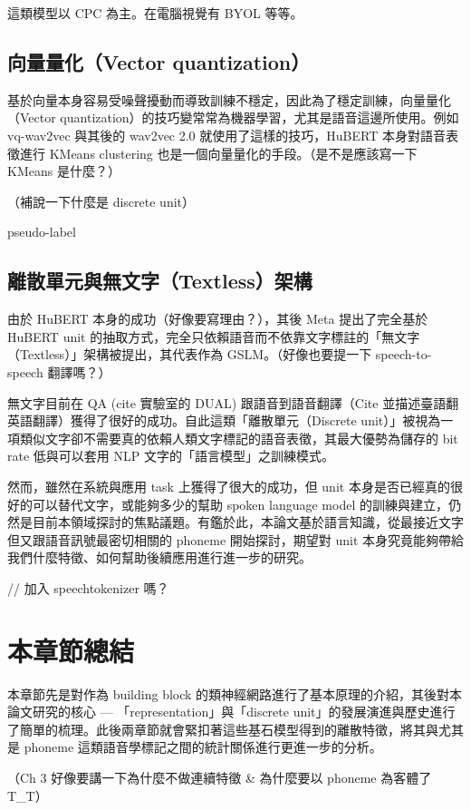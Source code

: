 這類模型以 CPC 為主。在電腦視覺有 BYOL 等等。

\subsection{向量量化（Vector quantization）}

基於向量本身容易受噪聲擾動而導致訓練不穩定，因此為了穩定訓練，向量量化（Vector quantization）的技巧變常常為機器學習，尤其是語音這邊所使用。例如 vq-wav2vec 與其後的 wav2vec 2.0 就使用了這樣的技巧，HuBERT 本身對語音表徵進行 KMeans clustering 也是一個向量量化的手段。（是不是應該寫一下 KMeans 是什麼？）

（補說一下什麼是 discrete unit）

pseudo-label 

\subsection{離散單元與無文字（Textless）架構}

由於 HuBERT 本身的成功（好像要寫理由？），其後 Meta 提出了完全基於 HuBERT unit 的抽取方式，完全只依賴語音而不依靠文字標註的「無文字（Textless）」架構被提出，其代表作為 GSLM。（好像也要提一下 speech-to-speech 翻譯嗎？）

無文字目前在 QA (cite 實驗室的 DUAL) 跟語音到語音翻譯（Cite 並描述臺語翻英語翻譯）獲得了很好的成功。自此這類「離散單元（Discrete unit）」被視為一項類似文字卻不需要真的依賴人類文字標記的語音表徵，其最大優勢為儲存的 bit rate 低與可以套用 NLP 文字的「語言模型」之訓練模式。

然而，雖然在系統與應用 task 上獲得了很大的成功，但 unit 本身是否已經真的很好的可以替代文字，或能夠多少的幫助 spoken language model 的訓練與建立，仍然是目前本領域探討的焦點議題。有鑑於此，本論文基於語言知識，從最接近文字但又跟語音訊號最密切相關的 phoneme 開始探討，期望對 unit 本身究竟能夠帶給我們什麼特徵、如何幫助後續應用進行進一步的研究。

// 加入 speechtokenizer 嗎？

\section{本章節總結}

本章節先是對作為 building block 的類神經網路進行了基本原理的介紹，其後對本論文研究的核心 --- 「representation」與「discrete unit」的發展演進與歷史進行了簡單的梳理。此後兩章節就會緊扣著這些基石模型得到的離散特徵，將其與尤其是 phoneme 這類語音學標記之間的統計關係進行更進一步的分析。

（Ch 3 好像要講一下為什麼不做連續特徵 \& 為什麼要以 phoneme 為客體了 T\_T）

 